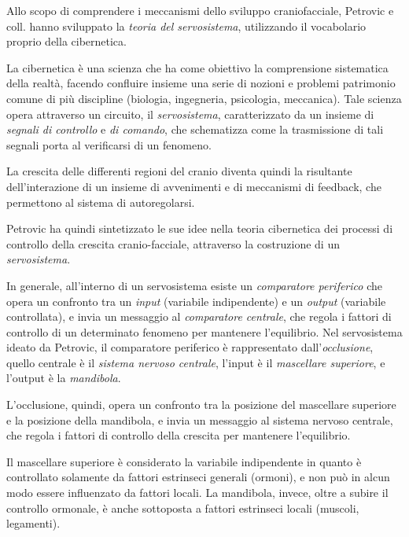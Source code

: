 Allo scopo di comprendere i meccanismi dello sviluppo craniofacciale, Petrovic e coll. hanno sviluppato la \textit{teoria del servosistema}, utilizzando il vocabolario proprio della cibernetica.

La cibernetica è una scienza che ha come obiettivo la comprensione sistematica della realtà, facendo confluire insieme una serie di nozioni e problemi patrimonio comune di più discipline (biologia, ingegneria, psicologia, meccanica). Tale scienza opera attraverso un circuito, il \textit{servosistema}, caratterizzato da un insieme di \textit{segnali di controllo} e \textit{di comando}, che schematizza come la trasmissione di tali segnali porta al verificarsi di un fenomeno.

La crescita delle differenti regioni del cranio diventa quindi la risultante dell'interazione di un insieme di avvenimenti e di meccanismi di feedback, che permettono al sistema di autoregolarsi.

Petrovic ha quindi sintetizzato le sue idee nella teoria cibernetica dei processi di controllo della crescita cranio-facciale, attraverso la costruzione di un \textit{servosistema}.

In generale, all'interno di un servosistema esiste un \textit{comparatore periferico} che opera un confronto tra un \textit{input} (variabile indipendente) e un \textit{output} (variabile controllata), e invia un messaggio al \textit{comparatore centrale}, che regola i fattori di controllo di un determinato fenomeno per mantenere l'equilibrio. Nel servosistema ideato da Petrovic, il comparatore periferico è rappresentato dall'\textit{occlusione}, quello centrale è il \textit{sistema nervoso centrale}, l'input è il \textit{mascellare superiore}, e l'output è la \textit{mandibola}.

L'occlusione, quindi, opera un confronto tra la posizione del mascellare superiore e la posizione della mandibola, e invia un messaggio al sistema nervoso centrale, che regola i fattori di controllo della crescita per mantenere l'equilibrio.

Il mascellare superiore è considerato la variabile indipendente in quanto è controllato solamente da fattori estrinseci generali (ormoni), e non può in alcun modo essere influenzato da fattori locali. La mandibola, invece, oltre a subire il controllo ormonale, è anche sottoposta a fattori estrinseci locali (muscoli, legamenti).
